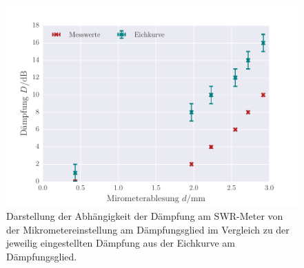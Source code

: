 \begin{figure}[!h]
 \centering
 \includegraphics[scale=0.9]{../Grafiken/Daempfung.pdf}
 \caption{Darstellung der Abhängigkeit der Dämpfung am SWR-Meter von der Mikrometereinstellung am Dämpfungsglied im Vergleich
 	zu der jeweilig eingestellten Dämpfung aus der Eichkurve am Dämpfungsglied.
 	  \label{fig:daempfung}}
 \end{figure} 